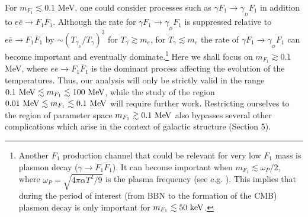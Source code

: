 \documentclass[12pt]{article}
\begin{document}
For $m _{F_1} \lesssim 0.1$ MeV, one could consider  processes such as $\gamma F _1 \rightarrow \gamma _{_D}F _1$ in addition to $e\overline{e} \rightarrow F _1\overline{F} _1$. Although the rate for $\gamma F_1 \rightarrow \gamma _{_D}F _1$ is suppressed relative to $e\overline{e} \rightarrow F_1 \overline{F} _1$ by $\sim \left ( T _{\gamma _{_D}}/T _{\gamma} \right ) ^3$ for $T _{\gamma} \gtrsim m _e$, for $T _{\gamma} \lesssim m _e$ the rate of $\gamma F_1 \rightarrow \gamma _{_D}F _1$ can become important and eventually dominate.\footnote{Another $F_1$ production channel that could be relevant for very low $F_1$ mass is plasmon decay ($\gamma \rightarrow F _1\overline{F} _1$). It can become important when $m _{F_1} \lesssim \omega _P/2$, where $\omega _P = \sqrt{4\pi\alpha T ^2/9}$ is the plasma frequency (see e.g. \cite{updated}). This implies that during the period of interest (from BBN to the formation of the CMB) plasmon decay is only important for $m _{F_1} \lesssim 50 \ {\rm keV}$.} Here we shall focus on $m _{F_1} \gtrsim 0.1$ MeV, where $e\overline{e} \rightarrow F _1\overline{F} _1$ is the dominant process affecting the evolution of the temperatures. Thus, our analysis will only be strictly valid in the range $0.1 \ {\rm MeV} \lesssim m _{F_1} \lesssim 100 \ {\rm MeV}$, while the study of the region $0.01 \ {\rm MeV} \lesssim m _{F_1} \lesssim 0.1 \ {\rm MeV}$ will require further work. Restricting ourselves to the region of parameter space $m _{F_1} \gtrsim 0.1 \ {\rm MeV}$ also bypasses several other complications which arise in the context of galactic structure (Section 5).
\end{document}
